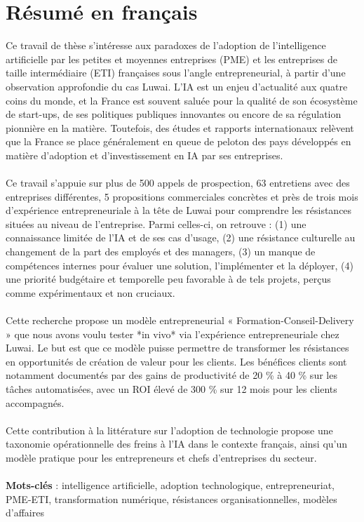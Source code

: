 \section*{Résumé en français}

Ce travail de thèse s’intéresse aux paradoxes de l’adoption de l’intelligence artificielle par les petites et moyennes entreprises (PME) et les entreprises de taille intermédiaire (ETI) françaises sous l’angle entrepreneurial, à partir d’une observation approfondie du cas Luwai. L’IA est un enjeu d’actualité aux quatre coins du monde, et la France est souvent saluée pour la qualité de son écosystème de start-ups, de ses politiques publiques innovantes ou encore de sa régulation pionnière en la matière. Toutefois, des études et rapports internationaux relèvent que la France se place généralement en queue de peloton des pays développés en matière d’adoption et d’investissement en IA par ses entreprises.
\\\\
Ce travail s’appuie sur plus de 500 appels de prospection, 63 entretiens avec des entreprises différentes, 5 propositions commerciales concrètes et près de trois mois d’expérience entrepreneuriale à la tête de Luwai pour comprendre les résistances situées au niveau de l’entreprise. Parmi celles-ci, on retrouve :
(1) une connaissance limitée de l’IA et de ses cas d’usage,
(2) une résistance culturelle au changement de la part des employés et des managers,
(3) un manque de compétences internes pour évaluer une solution, l’implémenter et la déployer,
(4) une priorité budgétaire et temporelle peu favorable à de tels projets, perçus comme expérimentaux et non cruciaux.
\\\\
Cette recherche propose un modèle entrepreneurial « Formation-Conseil-Delivery » que nous avons voulu tester *in vivo* via l’expérience entrepreneuriale chez Luwai. Le but est que ce modèle puisse permettre de transformer les résistances en opportunités de création de valeur pour les clients. Les bénéfices clients sont notamment documentés par des gains de productivité de 20 \% à 40 \% sur les tâches automatisées, avec un ROI élevé de 300 \% sur 12 mois pour les clients accompagnés.
\\\\
Cette contribution à la littérature sur l’adoption de technologie propose une taxonomie opérationnelle des freins à l’IA dans le contexte français, ainsi qu’un modèle pratique pour les entrepreneurs et chefs d’entreprises du secteur.
\\\\
\textbf{Mots-clés} : intelligence artificielle, adoption technologique, entrepreneuriat, PME-ETI, transformation numérique, résistances organisationnelles, modèles d’affaires


